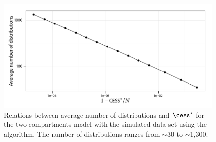 \begin{figure}[t]
  \UseAltLinespread
  \includegraphics[width=\linewidth]{fig_src/CESS_Iter_Mean}
  \caption[Relations between average number of distributions and
  \protect\cess]
  {Relations between average number of distributions and $\cess^\star$ for the
    two-compartments \pet model with the simulated data set using the \smc[2]
    algorithm. The number of distributions ranges from $\sim$30 to
    $\sim$1,300.}
  \label{fig:cess iter mean}
\end{figure}
